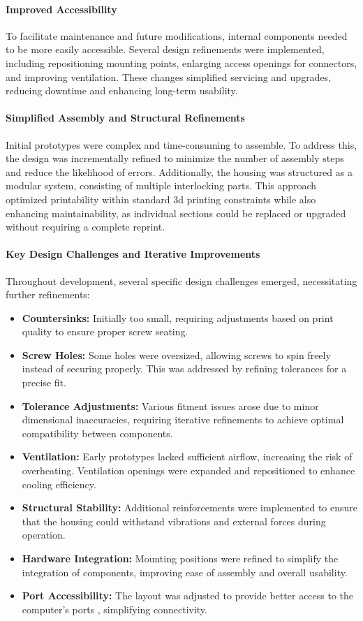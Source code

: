 \paragraph{Improved Accessibility}  
To facilitate maintenance and future modifications, internal components needed to be more easily accessible. Several design refinements were implemented, including repositioning mounting points, enlarging access openings for connectors, and improving ventilation. These changes simplified servicing and upgrades, reducing downtime and enhancing long-term usability.  

\paragraph{Simplified Assembly and Structural Refinements}  
Initial prototypes were complex and time-consuming to assemble. To address this, the design was incrementally refined to minimize the number of assembly steps and reduce the likelihood of errors. Additionally, the housing was structured as a modular system, consisting of multiple interlocking parts. This approach optimized printability within standard \acrshort{3d} printing constraints while also enhancing maintainability, as individual sections could be replaced or upgraded without requiring a complete reprint.  

\paragraph{Key Design Challenges and Iterative Improvements}  
Throughout development, several specific design challenges emerged, necessitating further refinements:  
\begin{itemize}  
	\item \textbf{Countersinks:} Initially too small, requiring adjustments based on print quality to ensure proper screw seating.  
	\item \textbf{Screw Holes:} Some holes were oversized, allowing screws to spin freely instead of securing properly. This was addressed by refining tolerances for a precise fit.  
	\item \textbf{Tolerance Adjustments:} Various fitment issues arose due to minor dimensional inaccuracies, requiring iterative refinements to achieve optimal compatibility between components.  
	\item \textbf{Ventilation:} Early prototypes lacked sufficient airflow, increasing the risk of overheating. Ventilation openings were expanded and repositioned to enhance cooling efficiency.  
	\item \textbf{Structural Stability:} Additional reinforcements were implemented to ensure that the housing could withstand vibrations and external forces during operation.  
	\item \textbf{Hardware Integration:} Mounting positions were refined to simplify the integration of components, improving ease of assembly and overall usability.  
	\item \textbf{Port Accessibility:} The layout was adjusted to provide better access to the computer’s ports \cite{armsom_sige7}, simplifying connectivity.  
\end{itemize}  

